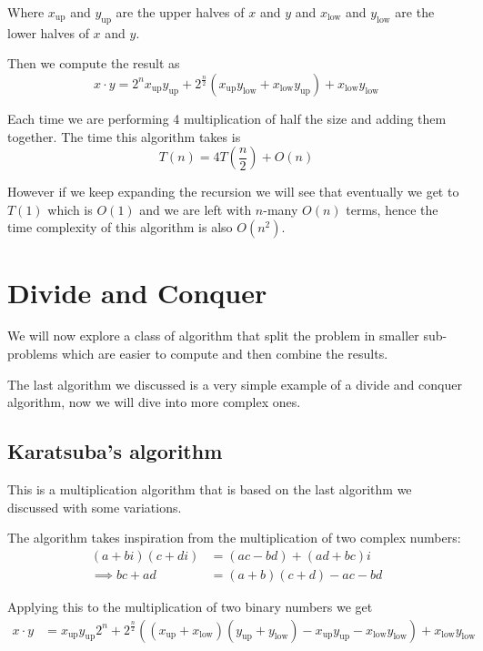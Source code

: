 \documentclass[12pt]{extarticle}
\begin{document}
Where $x_{\text{up}}$ and $y_{\text{up}}$ are the upper halves of $x$ and $y$ and $x_{\text{low}}$ and $y_{\text{low}}$ are the lower halves of $x$ and $y$.

Then we compute the result as
$$
    x \cdot y = 2^n x_{\text{up}}y_{\text{up}} + 2^{\frac{n}{2}}(x_{\text{up}}y_{\text{low}} + x_{\text{low}}y_{\text{up}}) + x_{\text{low}}y_{\text{low}}
$$

Each time we are performing 4 multiplication of half the size and adding them together.
The time this algorithm takes is
$$
    T(n) = 4T\left(\frac{n}{2}\right) + O(n)
$$

However if we keep expanding the recursion we will see that eventually we get to $T(1)$ which is $O(1)$
and we are left with $n$-many $O(n)$ terms, hence the time complexity of this algorithm is also $O(n^2)$.

\section{Divide and Conquer}

We will now explore a class of algorithm that
split the problem in smaller sub-problems which are easier to compute and then combine the results.

The last algorithm we discussed is a very simple example of a divide and conquer algorithm, now we will dive into more complex ones.

\subsection{Karatsuba's algorithm}

This is a multiplication algorithm that is based on the last algorithm we discussed with some variations.

The algorithm takes inspiration from the multiplication of two complex numbers:
\begin{align*}
    (a + bi)(c + di) & = (ac - bd) + (ad + bc)i   \\
    \implies bc + ad & = (a + b)(c + d) - ac - bd
\end{align*}

Applying this to the multiplication of two binary numbers we get
\begin{align*}
    x \cdot y & = x_{\text{up}} y_{\text{up}} 2^n
    + 2^\frac{n}{2}((x_{\text{up}} + x_{\text{low}})(y_{\text{up}} + y_{\text{low}}) - x_{\text{up}}y_{\text{up}} - x_{\text{low}}y_{\text{low}}) + x_{\text{low}}y_{\text{low}}
\end{align*}
\end{document}
